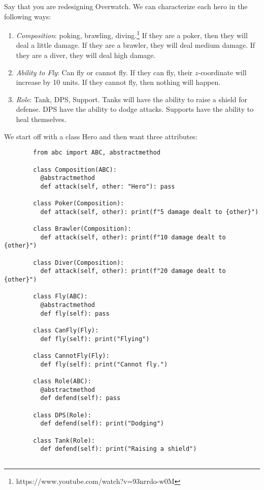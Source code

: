     \begin{example}[Overwatch]
      Say that you are redesigning Overwatch. We can characterize each hero in the following ways: 
      \begin{enumerate}
        \item \textit{Composition}: poking, brawling, diving.\footnote{https://www.youtube.com/watch?v=93nrrdo-w0M} If they are a poker, then they will deal a little damage. If they are a brawler, they will deal medium damage. If they are a diver, they will deal high damage. 
        \item \textit{Ability to Fly}: Can fly or cannot fly. If they can fly, their $z$-coordinate will increase by 10 units. If they cannot fly, then nothing will happen. 
        \item \textit{Role}: Tank, DPS, Support. Tanks will have the ability to raise a shield for defense. DPS have the ability to dodge attacks. Supports have the ability to heal themselves. 
      \end{enumerate}
      We start off with a class Hero and then want three attributes: 

      \begin{lstlisting}
        from abc import ABC, abstractmethod

        class Composition(ABC): 
          @abstractmethod
          def attack(self, other: "Hero"): pass 

        class Poker(Composition): 
          def attack(self, other): print(f"5 damage dealt to {other}")

        class Brawler(Composition): 
          def attack(self, other): print(f"10 damage dealt to {other}")

        class Diver(Composition): 
          def attack(self, other): print(f"20 damage dealt to {other}")

        class Fly(ABC): 
          @abstractmethod 
          def fly(self): pass 

        class CanFly(Fly): 
          def fly(self): print("Flying") 

        class CannotFly(Fly): 
          def fly(self): print("Cannot fly.") 

        class Role(ABC): 
          @abstractmethod 
          def defend(self): pass 

        class DPS(Role): 
          def defend(self): print("Dodging") 

        class Tank(Role): 
          def defend(self): print("Raising a shield")


\end{lstlisting}
\end{example}
